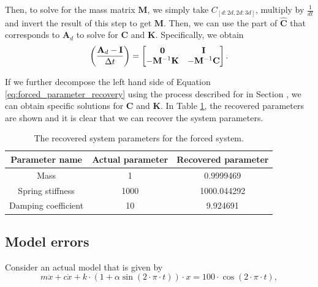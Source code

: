 \documentclass{article}
\begin{document}
Then, to solve for the mass matrix $\mathbf{M}$, we simply take $C_{[d:2d, 2d:3d]}$, multiply by $\frac{1}{dt}$ and invert the result of this step to get $\mathbf{M}$. Then, we can use the part of $\hat{\mathbf{C}}$ that corresponds to $\mathbf{A}_d$ to solve for $\mathbf{C}$ and $\mathbf{K}$. Specifically, we obtain
\begin{equation} \label{eq:forced_parameter_recovery}
\left( \frac{\mathbf{A}_d - \mathbf{I}}{\Delta t} \right) = 
\begin{bmatrix}
\mathbf{0} & \mathbf{I} \\
-\mathbf{M}^{-1}\mathbf{K} & -\mathbf{M}^{-1}\mathbf{C} \\
\end{bmatrix}. \\
\end{equation}

If we further decompose the left hand side of Equation \eqref{eq:forced_parameter_recovery} using the process described for in Section \label{section:unforced_parameter_recovery}, we can obtain specific solutions for $\mathbf{C}$ and $\mathbf{K}$. In Table \ref{tab:Q4b_table1}, the recovered parameters are shown and it is clear that we can recover the system parameters.
\begin{table}[!htb]
\centering
\caption{The recovered system parameters for the forced system.}
\label{tab:Q4b_table1}
\begin{tabular}{@{}ccc@{}}
\toprule
Parameter name & Actual parameter & Recovered parameter \\ \midrule
Mass & 1 & 0.9999469 \\
Spring stiffness & 1000 & 1000.044292 \\
Damping coefficient & 10 & 9.924691 \\ \bottomrule
\end{tabular}
\end{table}

\subsection{Model errors}
Consider an actual model that is given by
\begin{equation}\label{eq:time_varying_model}
m \ddot{x} + c \dot{x} + k \cdot \left( 1 + \alpha \sin\left(2 \cdot \pi \cdot t \right) \right) \cdot x = 100 \cdot \cos \left( 2 \cdot \pi \cdot t \right),
\end{equation}
\end{document}

